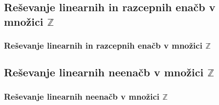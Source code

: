     \subsection{Reševanje linearnih in razcepnih enačb v množici $\mathbb{Z}$}

        \begin{frame}
            \frametitle{Reševanje linearnih in razcepnih enačb v množici $\mathbb{Z}$}
        \end{frame}

    \subsection{Reševanje linearnih neenačb v množici $\mathbb{Z}$}

        \begin{frame}
            \frametitle{Reševanje linearnih neenačb v množici $\mathbb{Z}$}
        \end{frame}
